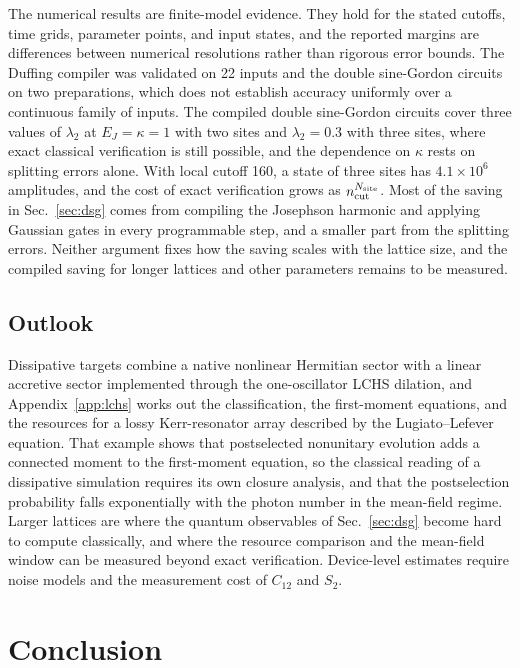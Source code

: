\documentclass[pra,twocolumn,superscriptaddress,nofootinbib,floatfix]{revtex4-2}
\theoremstyle{remark}
\begin{document}
The numerical results are finite-model evidence. They hold for the stated cutoffs, time grids, parameter points, and input states, and the reported margins are differences between numerical resolutions rather than rigorous error bounds. The Duffing compiler was validated on 22 inputs and the double sine-Gordon circuits on two preparations, which does not establish accuracy uniformly over a continuous family of inputs. The compiled double sine-Gordon circuits cover three values of \(\lambda_2\) at \(E_J=\kappa=1\) with two sites and \(\lambda_2=0.3\) with three sites, where exact classical verification is still possible, and the dependence on \(\kappa\) rests on splitting errors alone. With local cutoff 160, a state of three sites has \(4.1\times10^6\) amplitudes, and the cost of exact verification grows as \(n_{\rm cut}^{N_{\rm site}}\). Most of the saving in Sec.~\ref{sec:dsg} comes from compiling the Josephson harmonic and applying Gaussian gates in every programmable step, and a smaller part from the splitting errors. Neither argument fixes how the saving scales with the lattice size, and the compiled saving for longer lattices and other parameters remains to be measured.

\subsection{Outlook}

Dissipative targets combine a native nonlinear Hermitian sector with a linear accretive sector implemented through the one-oscillator LCHS dilation, and Appendix~\ref{app:lchs} works out the classification, the first-moment equations, and the resources for a lossy Kerr-resonator array described by the Lugiato--Lefever equation. That example shows that postselected nonunitary evolution adds a connected moment to the first-moment equation, so the classical reading of a dissipative simulation requires its own closure analysis, and that the postselection probability falls exponentially with the photon number in the mean-field regime. Larger lattices are where the quantum observables of Sec.~\ref{sec:dsg} become hard to compute classically, and where the resource comparison and the mean-field window can be measured beyond exact verification. Device-level estimates require noise models and the measurement cost of \(C_{12}\) and \(S_2\).

\section{Conclusion}
\label{sec:conclusion}
\end{document}

